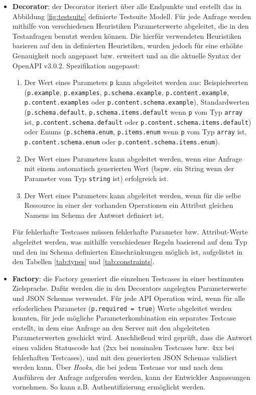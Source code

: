 \begin{itemize}
	\item \textbf{Decorator}: der Decorator iteriert über alle Endpunkte und erstellt das in Abbildung \ref{fig:testsuite} definierte Testsuite Modell. Für jede Anfrage werden mithilfe von verschiedenen Heuristiken Parameterwerte abgeleitet, die in den Testanfragen benutzt werden können. Die hierfür verwendeten Heuristiken basieren auf den in \textcite{ed2018automatic} definierten Heuristiken, wurden jedoch für eine erhöhte Genauigkeit noch angepasst bzw. erweitert und an die aktuelle Syntax der OpenAPI v3.0.2. Spezifikation angepasst: 
	\begin{enumerate}
		\item Der Wert eines Parameters \lstinline|p| kann abgeleitet werden aus: Beispielwerten (\lstinline|p.example|, \lstinline|p.examples|, \lstinline|p.schema.example|, \lstinline|p.content.example|, \lstinline|p.content.examples| oder \lstinline|p.content.schema.example|), Standardwerten (\lstinline|p.schema.default|, \lstinline|p.schema.items.default| wenn \lstinline|p| vom Typ \lstinline|array| ist, \lstinline|p.content.schema.default| oder \lstinline|p.content.schema.items.default|) oder Enums (\lstinline|p.schema.enum|,  \lstinline|p.items.enum| wenn \lstinline|p| vom Typ \lstinline|array| ist, \lstinline|p.content.schema.enum| oder \lstinline|p.content.schema.items.enum|).
		\item Der Wert eines Parameters kann abgeleitet werden, wenn eine Anfrage mit einem automatisch generierten Wert (bspw. ein String wenn der Parameter vom Typ \lstinline|string| ist) erfolgreich ist.
		\item Der Wert eines Parameters kann abgeleitet werden, wenn für die selbe Ressource in einer der vorhanden Operationen ein Attribut gleichen Namens im Schema der Antwort definiert ist.
	\end{enumerate}
	Für fehlerhafte Testcases müssen fehlerhafte Parameter bzw. Attribut-Werte abgeleitet werden, was mithilfe verschiedener Regeln basierend auf dem Typ und den im Schema definierten Einschränkungen möglich ist, aufgelistet in den Tabellen \ref{tab:types} und \ref{tab:constraints}. 
	\item \textbf{Factory}: die Factory generiert die einzelnen Testcases in einer bestimmten Zielsprache. Dafür werden die in den Decorators angelegten Parameterwerte und JSON Schemas verwendet. Für jede API Operation wird, wenn für alle erfoderlichen Parameter (\lstinline|p.required = true|) Werte abgeleitet werden konnten,  für jede mögliche Parameterkombination ein separates Testcase erstellt, in dem eine Anfrage an den Server mit den abgeleiteten Parameterwerten geschickt wird. Anschließend wird geprüft, dass die Antwort einen validen Statuscode hat (2xx bei nominalen Testcases bzw. 4xx bei fehlerhaften Testcases), und mit den generierten JSON Schemas validiert werden kann. Über \emph{Hooks}, die bei jedem Testcase vor und nach dem Ausführen der Anfrage aufgerufen werden, kann der Entwickler Anpassungen vornehmen. So kann z.B. Authentifizierung ermöglicht werden. 
\end{itemize}

